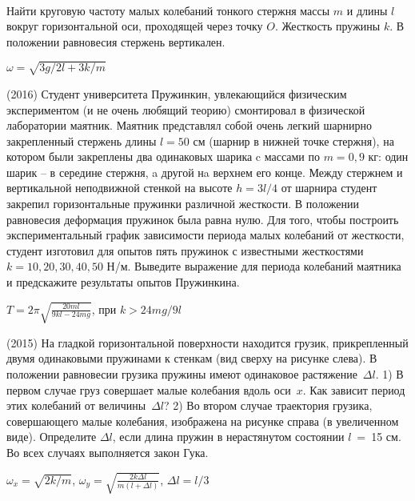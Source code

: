 \begin{ex}
\hspace{0pt} \\
\begin{minipage}{.65\textwidth} 
Найти круговую частоту малых колебаний тонкого стержня массы $m$ и длины $l$ вокруг горизонтальной оси, проходящей через точку $O$. 
Жесткость пружины $k$. В положении равновесия стержень вертикален.
\end{minipage}
\begin{minipage}{.35\textwidth}
\centering

\end{minipage}
\begin{ans}
$\omega = \sqrt{3g/2l+3k/m}$
\end{ans}
\end{ex}

\begin{ex}
(2016) Студент университета Пружинкин, увлекающийся физическим экспериментом (и не очень любящий теорию) смонтировал в физической лаборатории маятник. Маятник представлял собой очень легкий шарнирно закрепленный стержень длины $l = 50$ см (шарнир в нижней точке стержня), на котором были закреплены два одинаковых шарика c массами по $m = 0,9$ кг: один шарик -- в середине стержня, a другой нa верхнем его конце. Между стержнем и вертикальной неподвижной стенкой на высоте $h=3l/4$ от шарнира студент закрепил горизонтальные пружинки различной жесткости. В положении равновесия деформация пружинок была равна нулю. Для того, чтобы построить экспериментальный график зависимости периода малых колебаний от жесткости, студент изготовил для опытов пять пружинок с известными жесткостями $k = 10, 20, 30, 40, 50$ Н/м. Выведите выражение для периода колебаний маятника и предскажите результаты опытов Пружинкина.
\begin{center}

\end{center}
\begin{ans}
$T=2\pi \sqrt{\frac{20ml}{9kl-24mg}}$, при $k>24mg/9l$
\end{ans}
\end{ex}

\begin{ex}
(2015) На гладкой горизонтальной поверхности находится грузик, прикрепленный двумя одинаковыми пружинами к стенкам (вид сверху на рисунке слева). 
В положении равновесии грузика пружины имеют одинаковое растяжение~$\Delta l$. 1) В первом случае груз совершает малые колебания вдоль оси~$x$. 
Как зависит период этих колебаний от величины~$\Delta l$?   2) Во втором случае траектория грузика, совершающего малые колебания, изображена на рисунке справа (в увеличенном виде).
Определите $\Delta l$, если длина пружин в нерастянутом состоянии $l$~=~15 см. Во всех случаях выполняется закон Гука.
\begin{center}

\end{center}
\begin{ans}
$\omega_x = \sqrt{2k/m}$, $\omega_y=\sqrt{\frac{2k\Delta l}{m(l+\Delta l)}}$, $\Delta l = l/3$
\end{ans}
\end{ex}

